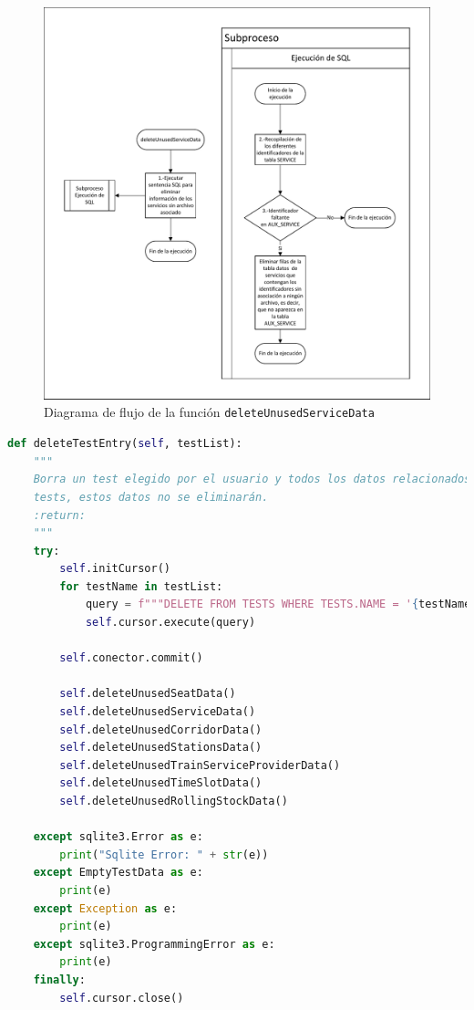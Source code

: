 \begin{figure}[H]
\centering
\includegraphics[width=.9\textwidth]{fig/Diagramas de flujo/deleteUnusedServiceData.pdf}
\caption{Diagrama de flujo de la función \texttt{deleteUnusedServiceData} }
\label{fig:diagramaFlujoDeleteUnusedServiceData}
\end{figure}

\begin{lstlisting}[language=Python,
                   style=python,
                   frame=none,
                   numbers=none,
                   basicstyle=\ttfamily\normalsize,
                   caption={Función \texttt{deleteTestEntry}},
                   label=src:functionDeleteTestEntry,
                   inputencoding=utf8]                   
def deleteTestEntry(self, testList):
    """
    Borra un test elegido por el usuario y todos los datos relacionados con este. Si los datos son comunes a otros
    tests, estos datos no se eliminarán.
    :return:
    """
    try:
        self.initCursor()
        for testName in testList:
            query = f"""DELETE FROM TESTS WHERE TESTS.NAME = '{testName}'"""
            self.cursor.execute(query)

        self.conector.commit()

        self.deleteUnusedSeatData()
        self.deleteUnusedServiceData()
        self.deleteUnusedCorridorData()
        self.deleteUnusedStationsData()
        self.deleteUnusedTrainServiceProviderData()
        self.deleteUnusedTimeSlotData()
        self.deleteUnusedRollingStockData()

    except sqlite3.Error as e:
        print("Sqlite Error: " + str(e))
    except EmptyTestData as e:
        print(e)
    except Exception as e:
        print(e)
    except sqlite3.ProgrammingError as e:
        print(e)
    finally:
        self.cursor.close()
\end{lstlisting}

